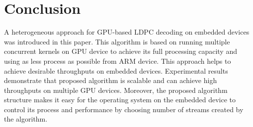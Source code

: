 \documentclass[conference]{IEEEtran}
\begin{document}
\section{Conclusion}
A heterogeneous approach for GPU-based LDPC decoding on embedded devices was introduced in this paper. This algorithm is based on running multiple concurrent kernels on GPU device to achieve its full processing capacity and using as less process as possible from ARM device. This approach helps to achieve desirable throughputs on embedded devices. Experimental results demonstrate that proposed algorithm is scalable and can achieve high throughputs on multiple GPU devices. Moreover, the proposed algorithm structure makes it easy for the operating system on the embedded device to control its process and performance by choosing number of streams created by the algorithm.







\end{document}
